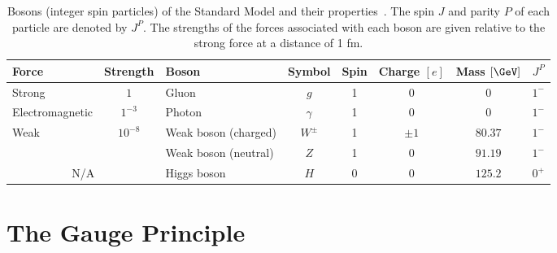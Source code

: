\begin{table}[h]
    \centering
    \caption{Bosons (integer spin particles) of the Standard Model and their properties~\cite{ParticleDataGroup}.
        The spin $J$ and parity $P$ of each particle are denoted by $J^P$. The strengths of the forces associated with each boson are given relative to the strong force at a distance of 1 \unit{\femto\metre}.}
    \begin{adjustbox}{max width=\textwidth}
        \label{tab:bosons}
        \renewcommand{\arraystretch}{1.5}
        \begin{tabular}{lclccccc}
            \toprule
            \hline
            Force                   & Strength                   & Boson                & Symbol   & Spin & Charge $[e]$ & Mass $[\GeV]$ & $J^P$ \\
            \hline
            Strong                  & $1$                        & Gluon                & $g$      & 1    & 0            & 0             & $1^-$ \\
            Electromagnetic         & $1^{-3}$                   & Photon               & $\gamma$ & 1    & 0            & 0             & $1^-$ \\
            \multirow{2}{*}{Weak}   & \multirow{2}{*}{$10^{-8}$} & Weak boson (charged) & $W^\pm$  & 1    & $\pm 1$      & $80.37$       & $1^-$ \\
                                    &                            & Weak boson (neutral) & $Z$      & 1    & 0            & $91.19$       & $1^-$ \\
            \hline
            \multicolumn{2}{c}{N/A} & Higgs boson                & $H$                  & 0        & 0    & $125.2$      & $0^+$                 \\
            \hline
        \end{tabular}
    \end{adjustbox}
\end{table}

\section{The Gauge Principle}
\label{sec:gauge_principle}

